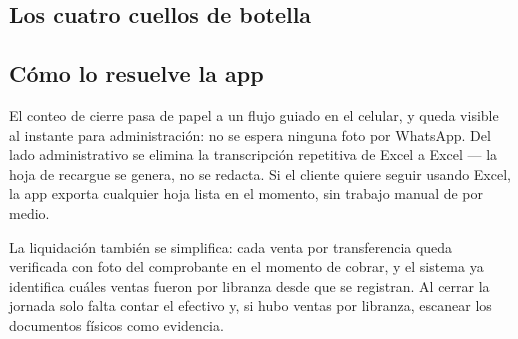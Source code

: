 \documentclass[11pt,a4paper]{article}
\begin{document}
\subsection*{Los cuatro cuellos de botella}

\begin{center}
\end{center}

\subsection*{Cómo lo resuelve la app}

El conteo de cierre pasa de papel a un flujo guiado en el celular, y queda visible
al instante para administración: no se espera ninguna foto por WhatsApp. Del lado
administrativo se elimina la transcripción repetitiva de Excel a Excel --- la hoja
de recargue se genera, no se redacta. Si el cliente quiere seguir usando Excel, la
app exporta cualquier hoja lista en el momento, sin trabajo manual de por medio.

La liquidación también se simplifica: cada venta por transferencia queda verificada
con foto del comprobante en el momento de cobrar, y el sistema ya identifica cuáles
ventas fueron por libranza desde que se registran. Al cerrar la jornada solo falta
contar el efectivo y, si hubo ventas por libranza, escanear los documentos físicos
como evidencia.
\end{document}
